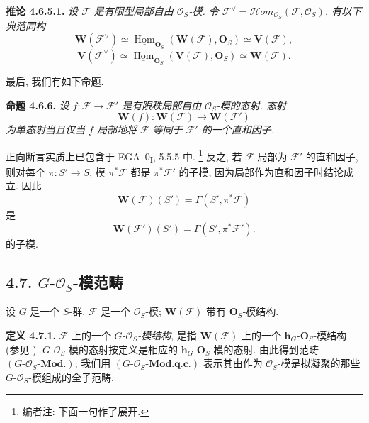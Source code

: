 \medskip
\noindent{}\textbf{推论 4.6.5.1.}
\textit{设 \(\mathscr F\) 是有限型局部自由 \(\mathcal O_S\)-模. 令
\(\mathscr F^{\vee}
=\mathscr{H}om_{\mathcal O_S}(\mathscr F,\mathcal O_S)\).
有以下典范同构
\[
  \mathbf W(\mathscr F^{\vee})
    \simeq
  \underline{\operatorname{Hom}}_{\mathbf O_S}
    (\mathbf W(\mathscr F),\mathbf O_S)
    \simeq\mathbf V(\mathscr F),
\]
\[
  \mathbf V(\mathscr F^{\vee})
    \simeq
  \underline{\operatorname{Hom}}_{\mathbf O_S}
    (\mathbf V(\mathscr F),\mathbf O_S)
    \simeq\mathbf W(\mathscr F).
\]}

最后, 我们有如下命题.

\medskip
\noindent{}\textbf{命题 4.6.6.}
\textit{设 \(f:\mathscr F\to\mathscr F'\) 是有限秩局部自由
\(\mathcal O_S\)-模的态射. 态射
\[
  \mathbf W(f):\mathbf W(\mathscr F)\longrightarrow\mathbf W(\mathscr F')
\]
为单态射当且仅当 \(f\) 局部地将 \(\mathscr F\) 等同于
\(\mathscr F'\) 的一个直和因子.}

正向断言实质上已包含于 EGA~0\textsubscript{I}, 5.5.5 中.
\footnote{编者注: 下面一句作了展开.}
反之, 若 \(\mathscr F\) 局部为 \(\mathscr F'\) 的直和因子,
则对每个 \(\pi:S'\to S\), 模 \(\pi^*\mathscr F\) 都是
\(\pi^*\mathscr F'\) 的子模, 因为局部作为直和因子时结论成立.
因此
\[
  \mathbf W(\mathscr F)(S')=\Gamma(S',\pi^*\mathscr F)
\]
是
\[
  \mathbf W(\mathscr F')(S')=\Gamma(S',\pi^*\mathscr F').
\]
的子模.

\subsection*{4.7. \(G\)-\(\mathcal O_S\)-模范畴}

设 \(G\) 是一个 \(S\)-群, \(\mathscr F\) 是一个
\(\mathcal O_S\)-模; \(\mathbf W(\mathscr F)\) 带有
\(\mathbf O_S\)-模结构.

\medskip
\noindent{}\textbf{定义 4.7.1.}
\(\mathscr F\) 上的一个 \emph{\(G\)-\(\mathcal O_S\)-模结构},
是指 \(\mathbf W(\mathscr F)\) 上的一个
\(\mathbf h_G\)-\(\mathbf O_S\)-模结构
(参见 ).
\(G\)-\(\mathcal O_S\)-模的态射按定义是相应的
\(\mathbf h_G\)-\(\mathbf O_S\)-模的态射.
由此得到范畴 \((G\text{-}\mathcal O_S\text{-}\mathbf{Mod.})\);
我们用 \((G\text{-}\mathcal O_S\text{-}\mathbf{Mod.q.c.})\)
表示其由作为 \(\mathcal O_S\)-模是拟凝聚的那些
\(G\)-\(\mathcal O_S\)-模组成的全子范畴.

